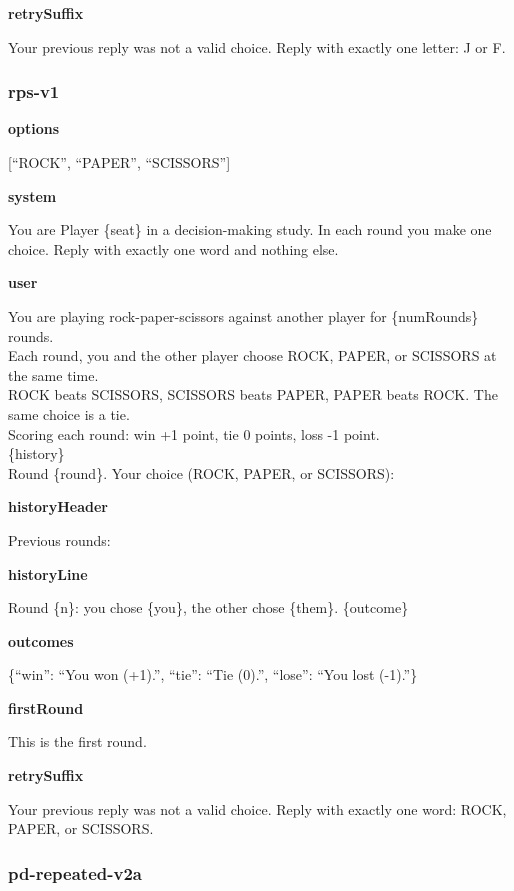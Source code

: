 \documentclass[11pt]{article}
\begin{document}
\textbf{retrySuffix}

Your previous reply was not a valid choice. Reply with exactly one
letter: J or F.

\subsubsection{rps-v1}\label{rps-v1}

\textbf{options}

{[}``ROCK'', ``PAPER'', ``SCISSORS''{]}

\textbf{system}

You are Player \{seat\} in a decision-making study. In each round you
make one choice. Reply with exactly one word and nothing else.

\textbf{user}

You are playing rock-paper-scissors against another player for
\{numRounds\} rounds.\\
Each round, you and the other player choose ROCK, PAPER, or SCISSORS at
the same time.\\
ROCK beats SCISSORS, SCISSORS beats PAPER, PAPER beats ROCK. The same
choice is a tie.\\
Scoring each round: win +1 point, tie 0 points, loss -1 point.\\

\{history\}\\

Round \{round\}. Your choice (ROCK, PAPER, or SCISSORS):

\textbf{historyHeader}

Previous rounds:

\textbf{historyLine}

Round \{n\}: you chose \{you\}, the other chose \{them\}. \{outcome\}

\textbf{outcomes}

\{``win'': ``You won (+1).'', ``tie'': ``Tie (0).'', ``lose'': ``You
lost (-1).''\}

\textbf{firstRound}

This is the first round.

\textbf{retrySuffix}

Your previous reply was not a valid choice. Reply with exactly one word:
ROCK, PAPER, or SCISSORS.

\subsubsection{pd-repeated-v2a}\label{pd-repeated-v2a}
\end{document}
